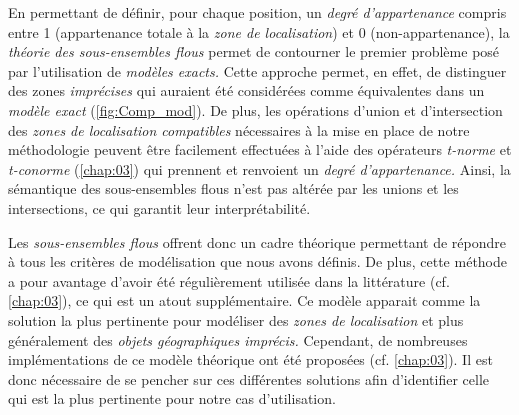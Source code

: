 En permettant de définir, pour chaque position, un \emph{degré
  d'appartenance} compris entre 1 (appartenance totale à la \emph{zone
  de localisation}) et 0 (non-appartenance), la \emph{théorie des
  sous-ensembles flous} permet de contourner le premier problème posé
par l'utilisation de \emph{modèles exacts.} Cette approche permet, en
effet, de distinguer des zones \emph{imprécises} qui auraient été
considérées comme équivalentes dans un \emph{modèle exact}
(\autoref{fig:Comp_mod}). De plus, les opérations d'union et
d'intersection des \emph{zones de localisation compatibles}
nécessaires à la mise en place de notre méthodologie peuvent être
facilement effectuées à l'aide des opérateurs \emph{t-norme} et
\emph{t-conorme} (\autoref{chap:03}) qui prennent et renvoient un
\emph{degré d'appartenance.} Ainsi, la sémantique des sous-ensembles
flous n'est pas altérée par les unions et les intersections, ce qui
garantit leur interprétabilité.

Les \emph{sous-ensembles flous} offrent donc un cadre théorique
permettant de répondre à tous les critères de modélisation que nous
avons définis. De plus, cette méthode a pour avantage d'avoir été
régulièrement utilisée dans la littérature (cf. \autoref{chap:03}), ce
qui est un atout supplémentaire. Ce modèle apparait comme la solution
la plus pertinente pour modéliser des \emph{zones de localisation} et
plus généralement des \emph{objets géographiques imprécis.} Cependant,
de nombreuses implémentations de ce modèle théorique ont été proposées
(cf. \autoref{chap:03}). Il est donc nécessaire de se pencher sur ces
différentes solutions afin d'identifier celle qui est la plus
pertinente pour notre cas d'utilisation.


